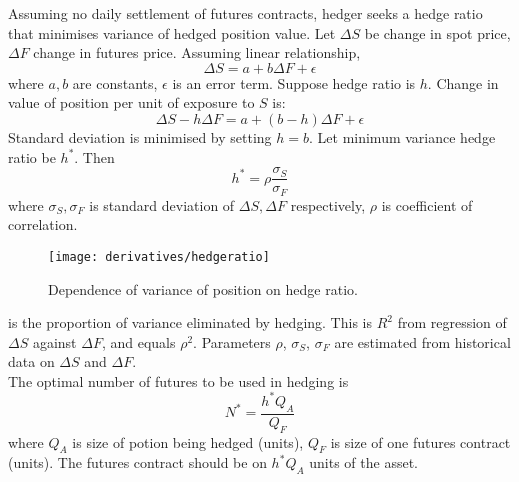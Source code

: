 Assuming no daily settlement of futures contracts, hedger seeks a hedge ratio that minimises variance of hedged position value. Let $\Delta S$ be change in spot price, $\Delta F$ change in futures price. Assuming linear relationship,
\begin{equation}
\Delta S = a + b \Delta F + \epsilon	 \nonumber
\end{equation}
where $a,b$ are constants, $\epsilon$ is an error term. Suppose hedge ratio is $h$. Change in value of position per unit of exposure to $S$ is:
\begin{equation}
\Delta S - h \Delta F = a + (b-h) \Delta F + \epsilon \nonumber
\end{equation}
Standard deviation is minimised by setting $h=b$. Let minimum variance hedge ratio be $h^*$. Then
\begin{equation}
h^* = \rho \frac{\sigma_S}{\sigma_F} \nonumber
\end{equation}
where $\sigma_S, \sigma_F$ is standard deviation of $\Delta S, \Delta F$ respectively, $\rho$ is coefficient of correlation.

\begin{figure}[H]
\centering
\texttt{[image: derivatives/hedgeratio]}
\caption{Dependence of variance of position on hedge ratio.}
\end{figure}

 is the proportion of variance eliminated by hedging. This is $R^2$ from regression of $\Delta S$ against $\Delta F$, and equals $\rho^2$. Parameters $\rho$, $\sigma_S$, $\sigma_F$ are estimated from historical data on $\Delta S$ and $\Delta F$.\\

The optimal number of futures to be used in hedging is
\begin{equation}
N^* = \frac{h^* Q_A}{Q_F} \nonumber
\end{equation}
where $Q_A$ is size of potion being hedged (units), $Q_F$ is size of one futures contract (units). The futures contract should be on $h^* Q_A$ units of the asset.



